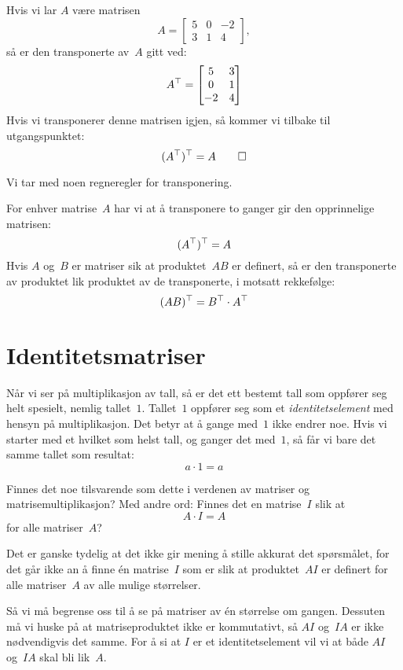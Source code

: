 \begin{ex}
Hvis vi lar $A$ være matrisen
\[
A =
\begin{bmatrix}
5 & 0 & -2 \\
3 & 1 &  4
\end{bmatrix},
\]
så er den transponerte av~$A$ gitt ved:
\[
A^\top =
\begin{bmatrix}
 5 & 3 \\
 0 & 1 \\
-2 & 4
\end{bmatrix}
\]
Hvis vi transponerer denne matrisen igjen, så kommer vi tilbake til
utgangspunktet:
\[
(A^\top)^\top = A\qedhere
\]
\end{ex}

Vi tar med noen regneregler for transponering.

\begin{thm}
For enhver matrise~$A$ har vi at å transponere to ganger gir den
opprinnelige matrisen:
\[
(A^\top)^\top = A
\]
Hvis $A$ og~$B$ er matriser sik at produktet~$AB$ er definert, så er
den transponerte av produktet lik produktet av de transponerte, i
motsatt rekkefølge:
\[
(AB)^\top = B^\top \cdot A^\top
\]
\end{thm}


\section*{Identitetsmatriser}

Når vi ser på multiplikasjon av tall, så er det ett bestemt tall som
oppfører seg helt spesielt, nemlig tallet~$1$.  Tallet~$1$ oppfører
seg som et \emph{identitetselement} med hensyn på multiplikasjon.  Det
betyr at å gange med~$1$ ikke endrer noe.  Hvis vi starter med et
hvilket som helst tall, og ganger det med~$1$, så får vi bare det
samme tallet som resultat:
\[
a \cdot 1 = a
\]

Finnes det noe tilsvarende som dette i verdenen av matriser og
matrisemultiplikasjon?  Med andre ord: Finnes det en matrise~$I$ slik
at
\[
A \cdot I = A
\]
for alle matriser~$A$?

Det er ganske tydelig at det ikke gir mening å stille akkurat det
spørsmålet, for det går ikke an å finne én matrise~$I$ som er slik at
produktet~$AI$ er definert for alle matriser~$A$ av alle mulige
størrelser.

Så vi må begrense oss til å se på matriser av én størrelse om gangen.
Dessuten må vi huske på at matriseproduktet ikke er kommutativt, så
$AI$ og~$IA$ er ikke nødvendigvis det samme.  For å si at $I$ er et
identitetselement vil vi at både $AI$ og~$IA$ skal bli lik~$A$.

